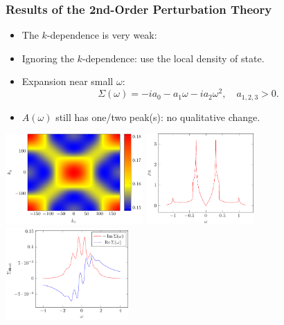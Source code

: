 \documentclass[xcolor=table, 10pt, aspectratio=169]{beamer}
\begin{document}
\begin{frame}
\frametitle{Results of the 2nd-Order Perturbation Theory}
\begin{itemize}
\item The $k$-dependence is very weak:
\item Ignoring the $k$-dependence: use the local density of state.
\item Expansion near small $\omega$:
\[\Sigma(\omega) = -ia_0-a_1\omega-ia_2\omega^2,\quad
a_{1,2,3}>0.\]
\item $A(\omega)$ still has one/two peak(s): no qualitative change.
\end{itemize}
\begin{center}
\includegraphics[height=3.5cm]{gammak_v1}
\includegraphics[height=3.5cm]{rho_dwave0}
\includegraphics[height=3.5cm]{ims_dwave}
\end{center}
\end{frame}
\end{document}
